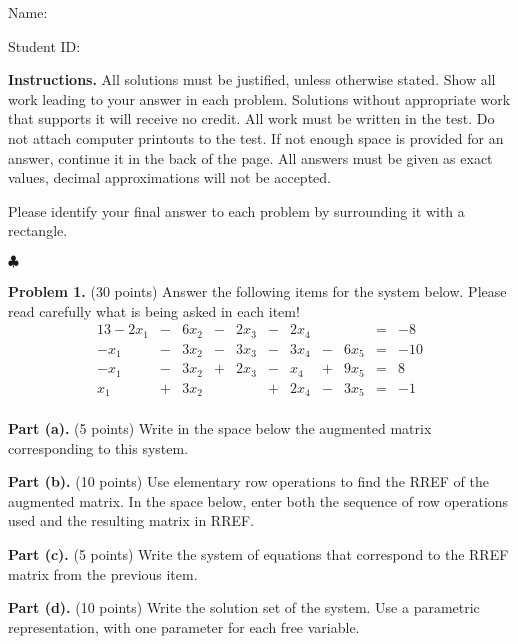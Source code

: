 \documentclass[12pt]{article}
\begin{document}
Name: \hrulefill

\bigskip
Student ID: \hrulefill

\bigskip
\textbf{Instructions.} All solutions must be justified, unless otherwise stated. Show all work leading to your answer in each problem. Solutions without appropriate work that supports it will receive no credit. All work must be written in the test. Do not attach computer printouts to the test. If not enough space is provided for an answer, continue it in the back of the page. All answers must be given as exact values, decimal approximations will not be accepted.

Please identify your final answer to each problem by surrounding it with a rectangle.

\vfill
\hfill$\clubsuit$

\clearpage

\textbf{Problem 1.} (30 points)
Answer the following items for the system below. Please read carefully what is being asked in each item!
\begin{alignat*}{13}
- 2 x_{1} &{}-{}& 6 x_{2} &{}-{}& 2 x_{3} &{}-{}& 2 x_{4}&{}{}& &{}={}&-8\\ 
- x_{1} &{}-{}& 3 x_{2} &{}-{}& 3 x_{3} &{}-{}& 3 x_{4} &{}-{}& 6 x_{5} &{}={}&-10\\ 
- x_{1} &{}-{}& 3 x_{2} &{}+{}& 2 x_{3} &{}-{}& x_{4} &{}+{}& 9 x_{5} &{}={}&8\\ 
x_{1} &{}+{}& 3 x_{2}&{}{}& &{}+{}& 2 x_{4} &{}-{}& 3 x_{5} &{}={}&-1\\ 
\end{alignat*}

\textbf{Part (a).} (5 points) Write in the space below the augmented matrix corresponding to this system.

\vskip1.5in

\textbf{Part (b).} (10 points) Use elementary row operations to find the RREF of the augmented matrix. In the space below, enter both the sequence of row operations used and the resulting matrix in RREF.

\clearpage

\textbf{Part (c).} (5 points) Write the system of equations that correspond to the RREF matrix from the previous item.

\vskip3in

\textbf{Part (d).} (10 points) Write the solution set of the system. Use a parametric representation, with one parameter for each free variable.

\clearpage
\end{document}

